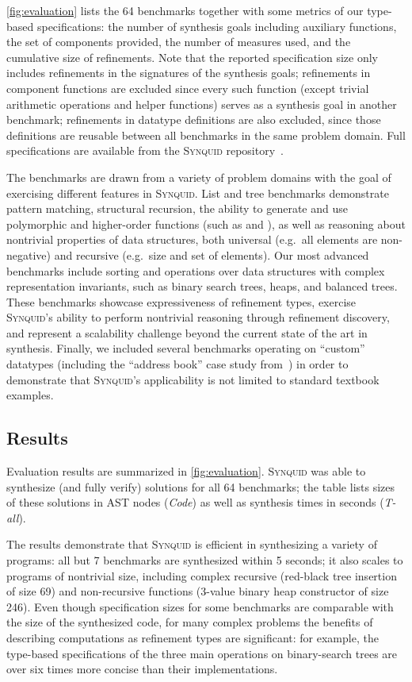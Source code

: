 \documentclass[10pt,preprint]{sigplanconf-pldi16}
\theoremstyle{definition}
\newcommand{\tool}{\textsc{Synquid}\xspace}
\newcommand{\exCount}{64\xspace}
\begin{document}
\autoref{fig:evaluation} lists the \exCount benchmarks together with  some metrics of our type-based specifications: 
the number of synthesis goals including auxiliary functions,
the set of components provided,
the number of measures used,
and the cumulative size of refinements.
Note that the reported specification size only includes refinements in the signatures of the synthesis goals;
refinements in component functions are excluded since every such function (except trivial arithmetic operations and helper functions) serves as a synthesis goal in another benchmark;
refinements in datatype definitions are also excluded, since those definitions are reusable between all benchmarks in the same problem domain.
Full specifications are available from the \tool repository~\cite{SynquidRepo}.

The benchmarks are drawn from a variety of problem domains with the goal of exercising different features in \tool.
List and tree benchmarks demonstrate pattern matching, structural recursion, 
the ability to generate and use polymorphic and higher-order functions (such as  and ), 
as well as reasoning about nontrivial properties of data structures,
both universal (e.g.\ all elements are non-negative) and recursive (e.g.\ size and set of elements).
Our most advanced benchmarks include sorting and operations over data structures with complex representation invariants,
such as binary search trees, heaps, and balanced trees.
These benchmarks showcase expressiveness of refinement types,
exercise \tool's ability to perform nontrivial reasoning through refinement discovery,
and represent a scalability challenge beyond the current state of the art in synthesis.
Finally, we included several benchmarks operating on ``custom'' datatypes
(including the ``address book'' case study from~\cite{KneussKuKuSu13})
in order to demonstrate that \tool's applicability is not limited to standard textbook examples.


\subsection{Results}\label{sec:eval:individual}

Evaluation results are summarized in \autoref{fig:evaluation}.
\tool was able to synthesize (and fully verify) solutions for all \exCount benchmarks;
the table lists sizes of these solutions in AST nodes (\emph{Code}) 
as well as synthesis times in seconds (\emph{T-all}).

The results demonstrate that \tool is efficient in synthesizing a variety of programs:
all but 7 benchmarks are synthesized within 5 seconds; 
it also scales to programs of nontrivial size, 
including complex recursive (red-black tree insertion of size 69) 
and non-recursive functions (3-value binary heap constructor of size 246).
Even though specification sizes for some benchmarks are comparable with the size of the synthesized code, 
for many complex problems the benefits of describing computations as refinement types are significant:
for example, the type-based specifications of the three main operations on binary-search trees are over six times more concise than their implementations.
\end{document}
